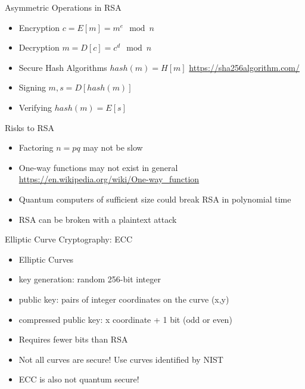\begin{withoutheadline}
\begin{frame}{Asymmetric Operations in RSA}
    \begin{itemize}
        \item Encryption $c = E[m] = m^e \mod n$
        \item Decryption $m = D[c] = c^d \mod n$
        \item Secure Hash Algorithms  $hash(m) = H[m]$ \url{https://sha256algorithm.com/}
        \item Signing    $m, s= D[hash(m)]$
        \item Verifying  $hash(m) = E[s]$
    \end{itemize}
\end{frame}

\begin{frame}{Risks to RSA}
    \begin{itemize}
        \item Factoring $n=pq$ may not be slow
        \item One-way functions may not exist in general
              \url{https://en.wikipedia.org/wiki/One-way\_function}
        \item Quantum computers of sufficient size could break RSA in polynomial time
        \item RSA can be broken with a plaintext attack
    \end{itemize}
\end{frame}


\begin{frame}{Elliptic Curve Cryptography: ECC}
    \begin{itemize}
        \item Elliptic Curves
        \item key generation: random 256-bit integer
        \item public key: pairs of integer coordinates on the curve (x,y)
        \item compressed public key: x coordinate + 1 bit (odd or even)
        \item Requires fewer bits than RSA
        \item Not all curves are secure! Use curves identified by NIST
        \item ECC is also not quantum secure!
    \end{itemize}
\end{frame}


\end{withoutheadline}
